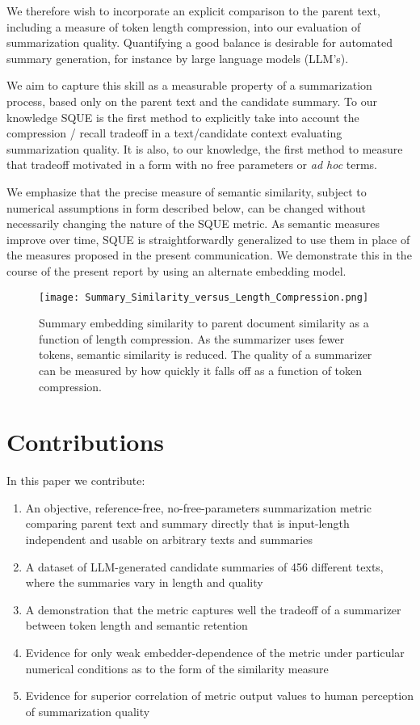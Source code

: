 \documentclass{article}
\begin{document}
We therefore wish to incorporate an explicit comparison to the parent text, including a measure of token length compression, into our evaluation of summarization quality.
Quantifying a good balance is desirable for automated summary generation, for instance by large language models (LLM's).

We aim to capture this skill as a measurable property of a summarization process, based only on the parent text and the candidate summary.
To our knowledge SQUE is the first method to explicitly take into account the compression / recall tradeoff in a text/candidate context evaluating summarization quality.
It is also, to our knowledge, the first method to measure that tradeoff motivated in a form with no free parameters or \textit{ad hoc} terms.

We emphasize that the precise measure of semantic similarity, subject to numerical assumptions in form described below, can be changed without necessarily changing the nature of the SQUE metric.
As semantic measures improve over time, SQUE is straightforwardly generalized to use them in place of the measures proposed in the present communication.
We demonstrate this in the course of the present report by using an alternate embedding model.

\begin{figure}
	\centering
	\texttt{[image: Summary\_Similarity\_versus\_Length\_Compression.png]}
	\caption{Summary embedding similarity to parent document similarity as a function of length compression.  As the summarizer uses fewer tokens, semantic similarity is reduced.  The quality of a summarizer can be measured by how quickly it falls off as a function of token compression.}
	\label{fig:similarityvslength}
\end{figure}

\section{Contributions}

In this paper we contribute:

\begin{enumerate}
	\item An objective, reference-free, no-free-parameters summarization metric comparing parent text and summary directly that is input-length independent and usable on arbitrary texts and summaries
	\item A dataset of LLM-generated candidate summaries of 456 different texts, where the summaries vary in length and quality
	\item A demonstration that the metric captures well the tradeoff of a summarizer between token length and semantic retention
	\item Evidence for only weak embedder-dependence of the metric under particular numerical conditions as to the form of the similarity measure
	\item Evidence for superior correlation of metric output values to human perception of summarization quality	
\end{enumerate}
\end{document}
